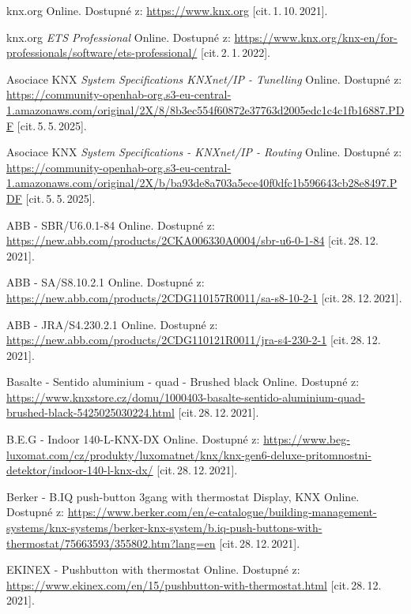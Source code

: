 \begin{thebibliography}{99}
		knx.org\/ Online.
		Dostupné z:
    \url{https://www.knx.org}
		[cit.\,1.\,10.\,2021]. 
    
		knx.org \emph{ETS Professional}\/ Online.
		Dostupné z:
    \url{https://www.knx.org/knx-en/for-professionals/software/ets-professional/}
		[cit.\,2.\,1.\,2022]. 

		Asociace KNX \emph{System Specifications KNXnet/IP - Tunelling}\/ Online.
		Dostupné z:
	\url{https://community-openhab-org.s3-eu-central-1.amazonaws.com/original/2X/8/8b3ec554f60872e37763d2005edc1c4c1fb16887.PDF}
		[cit.\,5.\,5.\,2025].

		Asociace KNX \emph{System Specifications - KNXnet/IP - Routing}\/ Online.
		Dostupné z:
	\url{https://community-openhab-org.s3-eu-central-1.amazonaws.com/original/2X/b/ba93de8a703a5ece40f0dfc1b596643cb28e8497.PDF}
		[cit.\,5.\,5.\,2025].

		ABB - SBR/U6.0.1-84\/ Online. 
		Dostupné z:
    \url{https://new.abb.com/products/2CKA006330A0004/sbr-u6-0-1-84}
		[cit.\,28.\,12.\,2021].
    
		ABB - SA/S8.10.2.1\/ Online.
		Dostupné z:
    \url{https://new.abb.com/products/2CDG110157R0011/sa-s8-10-2-1}
		[cit.\,28.\,12.\,2021]. 
    
		ABB - JRA/S4.230.2.1\/ Online. 
		Dostupné z:
    \url{https://new.abb.com/products/2CDG110121R0011/jra-s4-230-2-1}
		[cit.\,28.\,12.\,2021].
    
		Basalte - Sentido aluminium - quad - Brushed black\/ Online.
		Dostupné z:
    \url{https://www.knxstore.cz/domu/1000403-basalte-sentido-aluminium-quad-brushed-black-5425025030224.html}
		[cit.\,28.\,12.\,2021]. 
    
		B.E.G - Indoor 140-L-KNX-DX\/ Online. 
		Dostupné z:
    \url{https://www.beg-luxomat.com/cz/produkty/luxomatnet/knx/knx-gen6-deluxe-pritomnostni-detektor/indoor-140-l-knx-dx/}
		[cit.\,28.\,12.\,2021].  
    
		Berker - B.IQ push-button 3gang with thermostat Display, KNX\/ Online. 
		Dostupné z:
    \url{https://www.berker.com/en/e-catalogue/building-management-systems/knx-systems/berker-knx-system/b.iq-push-buttons-with-thermostat/75663593/355802.htm?lang=en}
		[cit.\,28.\,12.\,2021].
    
		EKINEX - Pushbutton with thermostat\/ Online. 
		Dostupné z:
    \url{https://www.ekinex.com/en/15/pushbutton-with-thermostat.html}
		[cit.\,28.\,12.\,2021].
    

\end{thebibliography}
